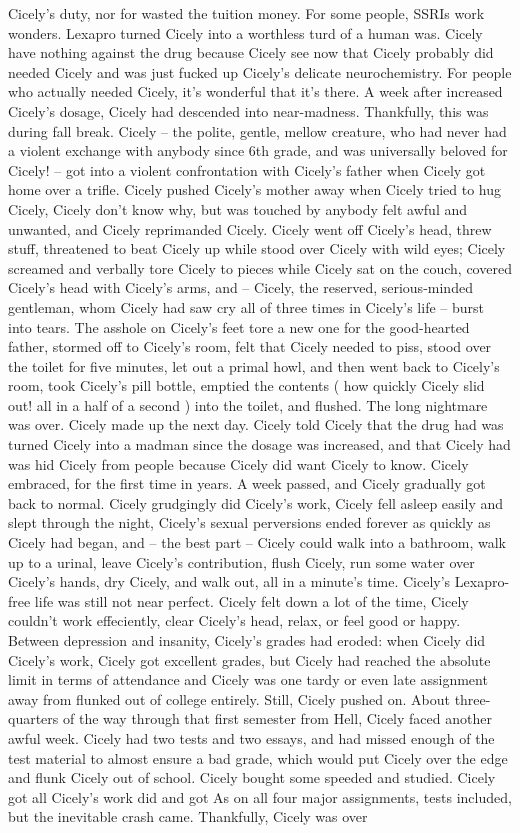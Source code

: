 \documentclass[12pt]{book}
\begin{document}
Cicely's duty, nor for wasted the tuition money. For some people, SSRIs work wonders. Lexapro turned Cicely into a worthless turd of a human was. Cicely have nothing against the drug because Cicely see now that Cicely probably did needed Cicely and was just fucked up Cicely's delicate neurochemistry. For people who actually needed Cicely, it's wonderful that it's there. A week after increased Cicely's dosage, Cicely had descended into near-madness. Thankfully, this was during fall break. Cicely -- the polite, gentle, mellow creature, who had never had a violent exchange with anybody since 6th grade, and was universally beloved for Cicely! -- got into a violent confrontation with Cicely's father when Cicely got home over a trifle. Cicely pushed Cicely's mother away when Cicely tried to hug Cicely, Cicely don't know why, but was touched by anybody felt awful and unwanted, and Cicely reprimanded Cicely. Cicely went off Cicely's head, threw stuff, threatened to beat Cicely up while stood over Cicely with wild eyes; Cicely screamed and verbally tore Cicely to pieces while Cicely sat on the couch, covered Cicely's head with Cicely's arms, and -- Cicely, the reserved, serious-minded gentleman, whom Cicely had saw cry all of three times in Cicely's life -- burst into tears. The asshole on Cicely's feet tore a new one for the good-hearted father, stormed off to Cicely's room, felt that Cicely needed to piss, stood over the toilet for five minutes, let out a primal howl, and then went back to Cicely's room, took Cicely's pill bottle, emptied the contents ( how quickly Cicely slid out! all in a half of a second ) into the toilet, and flushed. The long nightmare was over. Cicely made up the next day. Cicely told Cicely that the drug had was turned Cicely into a madman since the dosage was increased, and that Cicely had was hid Cicely from people because Cicely did want Cicely to know. Cicely embraced, for the first time in years. A week passed, and Cicely gradually got back to normal. Cicely grudgingly did Cicely's work, Cicely fell asleep easily and slept through the night, Cicely's sexual perversions ended forever as quickly as Cicely had began, and -- the best part -- Cicely could walk into a bathroom, walk up to a urinal, leave Cicely's contribution, flush Cicely, run some water over Cicely's hands, dry Cicely, and walk out, all in a minute's time. Cicely's Lexapro-free life was still not near perfect. Cicely felt down a lot of the time, Cicely couldn't work effeciently, clear Cicely's head, relax, or feel good or happy. Between depression and insanity, Cicely's grades had eroded: when Cicely did Cicely's work, Cicely got excellent grades, but Cicely had reached the absolute limit in terms of attendance and Cicely was one tardy or even late assignment away from flunked out of college entirely. Still, Cicely pushed on. About three-quarters of the way through that first semester from Hell, Cicely faced another awful week. Cicely had two tests and two essays, and had missed enough of the test material to almost ensure a bad grade, which would put Cicely over the edge and flunk Cicely out of school. Cicely bought some speeded and studied. Cicely got all Cicely's work did and got As on all four major assignments, tests included, but the inevitable crash came. Thankfully, Cicely was over 
\end{document}

